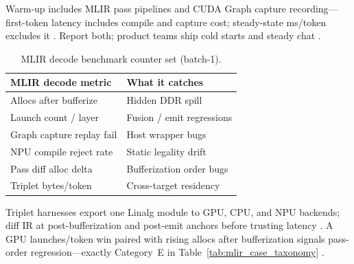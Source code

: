 Warm-up includes MLIR pass pipelines and CUDA Graph capture recording---first-token latency includes compile and capture cost; steady-state ms/token excludes it \citep{nvidia2024cudagraphs,memoryfloor2026,yirage2026,patel2025llminference,taxbreak2026,chen2020compilerbasedhardw,kwon2023vllm,liu2024deepseekv3,amd2024aie,amd2024xdna,dao2022flashattention,dao2023flashdecoding,nvidia2024cudagraphs,nvidia2022hopper,semianalysis2024tma,dlbook}. Report both; product teams ship cold starts and steady chat \citep{patel2025llminference,kwon2023vllm,yirage2026,memoryfloor2026,taxbreak2026,chen2020compilerbasedhardw,liu2024deepseekv3,amd2024aie,amd2024xdna,dao2022flashattention,dao2023flashdecoding,nvidia2024cudagraphs,nvidia2022hopper,semianalysis2024tma,dlbook}.

\begin{table}[t]
\centering
\small
\begin{tabular}{@{}ll@{}}
\toprule
\textbf{MLIR decode metric} & \textbf{What it catches} \\
\midrule
Allocs after bufferize & Hidden DDR spill \\
Launch count / layer & Fusion / emit regressions \\
Graph capture replay fail & Host wrapper bugs \\
NPU compile reject rate & Static legality drift \\
Pass diff alloc delta & Bufferization order bugs \\
Triplet bytes/token & Cross-target residency \\
\bottomrule
\end{tabular}
\caption{MLIR decode benchmark counter set (batch-1).}
\label{tab:ch14_mlir_benchmark}
\end{table}

Triplet harnesses export one Linalg module to GPU, CPU, and NPU backends; diff IR at post-bufferization and post-emit anchors before trusting latency \citep{yirage2026,chen2020compilerbasedhardw,patel2025llminference,memoryfloor2026,taxbreak2026,kwon2023vllm,liu2024deepseekv3,amd2024aie,amd2024xdna,dao2022flashattention,dao2023flashdecoding,nvidia2024cudagraphs,nvidia2022hopper,semianalysis2024tma,dlbook}. A GPU launches/token win paired with rising allocs after bufferization signals pass-order regression---exactly Category~E in Table~\ref{tab:mlir_case_taxonomy} \citep{memoryfloor2026,yirage2026,chen2020compilerbasedhardw,taxbreak2026,patel2025llminference,kwon2023vllm,liu2024deepseekv3,amd2024aie,amd2024xdna,dao2022flashattention,dao2023flashdecoding,nvidia2024cudagraphs,nvidia2022hopper,semianalysis2024tma,dlbook}.

